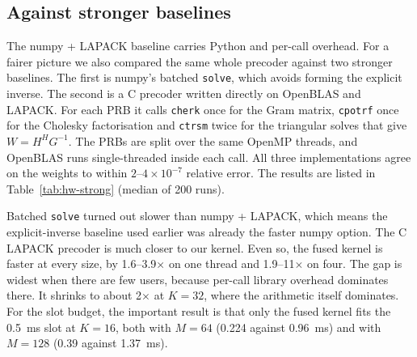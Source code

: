 \subsection{Against stronger baselines}

The numpy + LAPACK baseline carries Python and per-call overhead. For a fairer picture we also compared the same whole precoder against two stronger baselines. The first is numpy's batched \texttt{solve}, which avoids forming the explicit inverse. The second is a C precoder written directly on OpenBLAS and LAPACK. For each PRB it calls \texttt{cherk} once for the Gram matrix, \texttt{cpotrf} once for the Cholesky factorisation and \texttt{ctrsm} twice for the triangular solves that give $W = H^H G^{-1}$. The PRBs are split over the same OpenMP threads, and OpenBLAS runs single-threaded inside each call. All three implementations agree on the weights to within $2$--$4\times10^{-7}$ relative error. The results are listed in Table~\ref{tab:hw-strong} (median of 200 runs).

\begin{table}[H]
\caption{Whole-precoder time per slot against stronger baselines (273 PRBs, complex64, same 4-core AVX-512 Xeon).}
\label{tab:hw-strong}
\centering\small
{}
\end{table}

Batched \texttt{solve} turned out slower than numpy + LAPACK, which means the explicit-inverse baseline used earlier was already the faster numpy option. The C LAPACK precoder is much closer to our kernel. Even so, the fused kernel is faster at every size, by 1.6--3.9$\times$ on one thread and 1.9--11$\times$ on four. The gap is widest when there are few users, because per-call library overhead dominates there. It shrinks to about 2$\times$ at $K = 32$, where the arithmetic itself dominates. For the slot budget, the important result is that only the fused kernel fits the 0.5~ms slot at $K = 16$, both with $M = 64$ (0.224 against 0.96~ms) and with $M = 128$ (0.39 against 1.37~ms).

